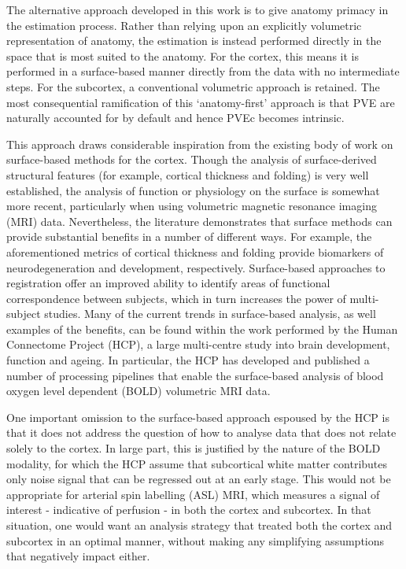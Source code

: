 The alternative approach developed in this work is to give anatomy primacy in the estimation process. Rather than relying upon an explicitly volumetric representation of anatomy, the estimation is instead performed directly in the space that is most suited to the anatomy. For the cortex, this means it is performed in a surface-based manner directly from the data with no intermediate steps. For the subcortex, a conventional volumetric approach is retained. The most consequential ramification of this `anatomy-first' approach is that PVE are naturally accounted for by default and hence PVEc becomes intrinsic.  

This approach draws considerable inspiration from the existing body of work on surface-based methods for the cortex. Though the analysis of surface-derived structural features (for example, cortical thickness and folding) is very well established, the analysis of function or physiology on the surface is somewhat more recent, particularly when using volumetric magnetic resonance imaging (MRI) data. Nevertheless, the literature demonstrates that surface methods can provide substantial benefits in a number of different ways. For example, the aforementioned metrics of cortical thickness and folding provide biomarkers of neurodegeneration and development, respectively. Surface-based approaches to registration offer an improved ability to identify areas of functional correspondence between subjects, which in turn increases the power of multi-subject studies. Many of the current trends in surface-based analysis, as well examples of the benefits, can be found within the work performed by the Human Connectome Project (HCP), a large multi-centre study into brain development, function and ageing. In particular, the HCP has developed and published a number of processing pipelines that enable the surface-based analysis of blood oxygen level dependent (BOLD) volumetric MRI data. 

One important omission to the surface-based approach espoused by the HCP is that it does not address the question of how to analyse data that does not relate solely to the cortex. In large part, this is justified by the nature of the BOLD modality, for which the HCP assume that subcortical white matter contributes only noise signal that can be regressed out at an early stage. This would not be appropriate for arterial spin labelling (ASL) MRI, which measures a signal of interest - indicative of perfusion - in both the cortex and subcortex. In that situation, one would want an analysis strategy that treated both the cortex and subcortex in an optimal manner, without making any simplifying assumptions that negatively impact either. 

